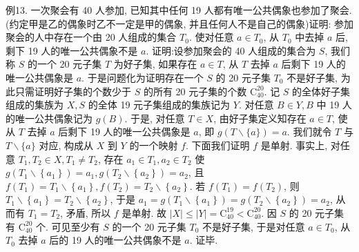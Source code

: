 例13. 一次聚会有 40 人参加, 已知其中任何 19 人都有唯一公共偶象也参加了聚会.
(约定甲是乙的偶象时乙不一定是甲的偶象, 并且任何人不是自己的偶象)证明: 参加聚会的人中存在一个由 20 人组成的集合 $T_0$. 使对任意 $a \in T_0$, 从 $T_0$ 中去掉 $a$ 后, 剩下 19 人的唯一公共偶象不是 $a$.
证明:设参加聚会的 40 人组成的集合为 $S$, 我们称 $S$ 的一个 20 元子集 $T$ 为好子集, 如果存在 $a \in T$, 从 $T$ 去掉 $a$ 后剩下 19 人的唯一公共偶象是 $a$.
于是问题化为证明存在一个 $S$ 的 20 元子集 $T_0$ 不是好子集, 为此只需证明好子集的个数少于 $S$ 的所有 20 元子集的个数 $\mathrm{C}_{40}^{20}$.
记 $S$ 的全体好子集组成的集族为 $X, S$ 的全体 19 元子集组成的集族记为 $Y$. 对任意 $B \in Y, B$ 中 19 人的唯一公共偶象记为 $g(B)$. 于是, 对任意 $T \in X$, 由好子集定义知存在 $a \in T$, 使从 $T$ 去掉 $a$ 后剩下 19 人的唯一公共偶象是 $a$, 即 $g(T \backslash\{a\})=a$. 我们就令 $T$ 与 $T \backslash\{a\}$ 对应, 构成从 $X$ 到 $Y$ 的一个映射 $f$. 下面我们证明 $f$ 是单射.
事实上, 对任意 $T_1, T_2 \in X, T_1 \neq T_2$, 存在 $a_1 \in T_1, a_2 \in T_2$ 使 $g\left(T_1 \backslash\left\{a_1\right\}\right)=a_1, g\left(T_2 \backslash\left\{a_2\right\}\right)=a_2$, 且 $f\left(T_1\right)= T_1 \backslash\left\{a_1\right\}, f\left(T_2\right)=T_2 \backslash\left\{a_2\right\}$. 若 $f\left(T_1\right)=f\left(T_2\right)$, 则 $T_1 \backslash\left\{a_1\right\}=T_2 \backslash\left\{a_2\right\}$, 于是 $a_1=g\left(T_1 \backslash\left\{a_1\right\}\right)=g\left(T_2 \backslash\left\{a_2\right\}\right)=a_2$, 从而有 $T_1=T_2$, 矛盾, 所以 $f$ 是单射.
故 $|X| \leqslant|Y|=\mathrm{C}_{40}^{19}<\mathrm{C}_{40}^{20}$. 因 $S$ 的 20 元子集有 $\mathrm{C}_{40}^{20}$ 个.
可见至少有 $S$ 的一个 20 元子集 $T_0$ 不是好子集, 于是对任意 $a \in T_0$, 从 $T_0$ 去掉 $a$ 后的 19 人的唯一公共偶象不是 $a$. 证毕.



